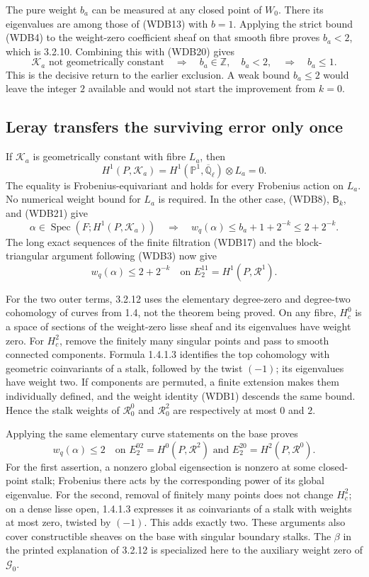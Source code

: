 The pure weight \(b_a\) can be measured at any closed point of
\(W_0\). There its eigenvalues are among those of (WDB13) with
\(b=1\). Applying the strict bound (WDB4) to the weight-zero
coefficient sheaf on that smooth fibre proves \(b_a<2\), which
is 3.2.10. Combining this with (WDB20) gives
\[
 \mathcal K_a\text{ not geometrically constant}
 \quad\Longrightarrow\quad b_a\in\mathbb Z,\quad b_a<2,
 \quad\Longrightarrow\quad b_a\le1.
 \tag{WDB21}
\]
This is the decisive return to the earlier exclusion. A weak bound
\(b_a\le2\) would leave the integer \(2\) available and would
not start the improvement from \(k=0\).

\subsection{Leray transfers the surviving error only once}

If \(\mathcal K_a\) is geometrically constant with fibre \(L_a\),
then
\[
 H^1(P,\mathcal K_a)
   =H^1(\mathbb P^1,\overline{\mathbb Q}_\ell)\otimes L_a=0.
 \tag{WDB22}
\]
The equality is Frobenius-equivariant and holds for every Frobenius
action on \(L_a\). No numerical weight bound for \(L_a\) is
required. In the other case, (WDB8), \(\mathsf B_k\), and (WDB21)
give
\[
 \alpha\in\operatorname{Spec}(F;H^1(P,\mathcal K_a))
 \quad\Longrightarrow\quad
 w_q(\alpha)\le b_a+1+2^{-k}\le2+2^{-k}.
 \tag{WDB23}
\]
The long exact sequences of the finite filtration (WDB17) and the
block-triangular argument following (WDB3) now give
\[
 w_q(\alpha)\le2+2^{-k}
 \quad\text{on }E_2^{11}=H^1(P,\mathcal R^1).
 \tag{WDB24}
\]

For the two outer terms, 3.2.12 uses the elementary degree-zero and
degree-two cohomology of curves from 1.4, not the theorem being
proved. On any fibre, \(H_c^0\) is a space of sections of the
weight-zero lisse sheaf and its eigenvalues have weight zero.
For \(H_c^2\), remove the finitely many singular points and pass
to smooth connected components. Formula 1.4.1.3 identifies the
top cohomology with geometric coinvariants of a stalk, followed by
the twist \((-1)\); its eigenvalues have weight two. If components
are permuted, a finite extension makes them individually defined,
and the weight identity (WDB1) descends the same bound. Hence the
stalk weights of \(\mathcal R^0_0\) and \(\mathcal R^2_0\)
are respectively at most \(0\) and \(2\).

Applying the same elementary curve statements on the base proves
\[
 w_q(\alpha)\le2
 \quad\text{on }E_2^{02}=H^0(P,\mathcal R^2)
 \text{ and }E_2^{20}=H^2(P,\mathcal R^0).
 \tag{WDB25}
\]
For the first assertion, a nonzero global eigensection is nonzero
at some closed-point stalk; Frobenius there acts by the corresponding
power of its global eigenvalue. For the second, removal of finitely
many points does not change \(H_c^2\); on a dense lisse open,
1.4.1.3 expresses it as coinvariants of a stalk with weights at most
zero, twisted by \((-1)\). This adds exactly two. These arguments
also cover constructible sheaves on the base with singular boundary
stalks. The \(\beta\) in the printed explanation of 3.2.12 is
specialized here to the auxiliary weight zero of \(\mathcal G_0\).

